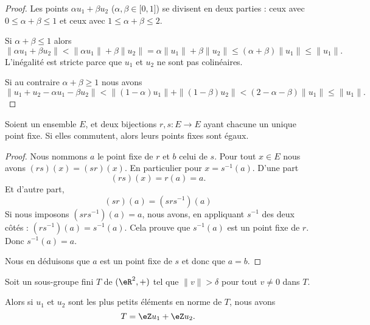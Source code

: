 \begin{proof}
	Les points \( \alpha u_1+\beta u_2\) (\( \alpha,\beta\in \mathopen[ 0 , 1 \mathclose]\)) se divisent en deux parties : ceux avec \( 0\leq\alpha+\beta\leq 1\) et ceux avec \( 1\leq\alpha+\beta\leq 2\).

	Si \( \alpha+\beta\leq 1\) alors
	\begin{equation}
		\| \alpha u_1+\beta u_2 \|<\| \alpha u_1 \|+\beta\| u_2 \|= \alpha\| u_1 \|+\beta\| u_2 \|\leq (\alpha+\beta)\| u_1 \|\leq \| u_1 \|.
	\end{equation}
	L'inégalité est stricte parce que \( u_1\) et \( u_2\) ne sont pas colinéaires.

	Si au contraire \( \alpha+\beta\geq 1\) nous avons
	\begin{equation}
		\| u_1+u_2-\alpha u_1-\beta u_2 \|<\| (1-\alpha)u_1 \|+\| (1-\beta)u_2 \|<(2-\alpha-\beta)\| u_1 \|\leq \| u_1 \|.
	\end{equation}
\end{proof}

\begin{lemma}       \label{LEMooWKTGooQlfuxm}
	Soient un ensemble \( E\), et deux bijections \( r,s\colon E\to E\) ayant chacune un unique point fixe. Si elles commutent, alors leurs points fixes sont égaux.
\end{lemma}

\begin{proof}
	Nous nommons \( a\) le point fixe de \( r\) et \( b\) celui de \( s\). Pour tout \( x\in E\) nous avons \( (rs)(x)=(sr)(x)\). En particulier pour \( x=s^{-1}(a)\). D'une part
	\begin{equation}
		(rs)(x)=r(a)=a.
	\end{equation}
	Et d'autre part,
	\begin{equation}
		(sr)(a)=(srs^{-1})(a)
	\end{equation}
	Si nous imposons \( (srs^{-1})(a)=a\), nous avons, en appliquant \( s^{-1}\) des deux côtés : \( (rs^{-1})(a)=s^{-1}(a)\). Cela prouve que \( s^{-1}(a)\) est un point fixe de \( r\). Donc \( s^{-1}(a)=a\).

	Nous en déduisons que \( a\) est un point fixe de \( s\) et donc que \( a=b\).
\end{proof}

\begin{lemma}       \label{LEMooDGSJooCiBhZz}
	Soit un sous-groupe fini \( T\) de \( (\eR^2,+)\) tel que \( \| v \|>\delta \) pour tout \( v\neq 0\) dans \( T\).

	Alors si \( u_1\) et \( u_2\) sont les plus petits éléments en norme de \( T\), nous avons
	\begin{equation}
		T=\eZ u_1+\eZ u_2.
	\end{equation}
\end{lemma}

